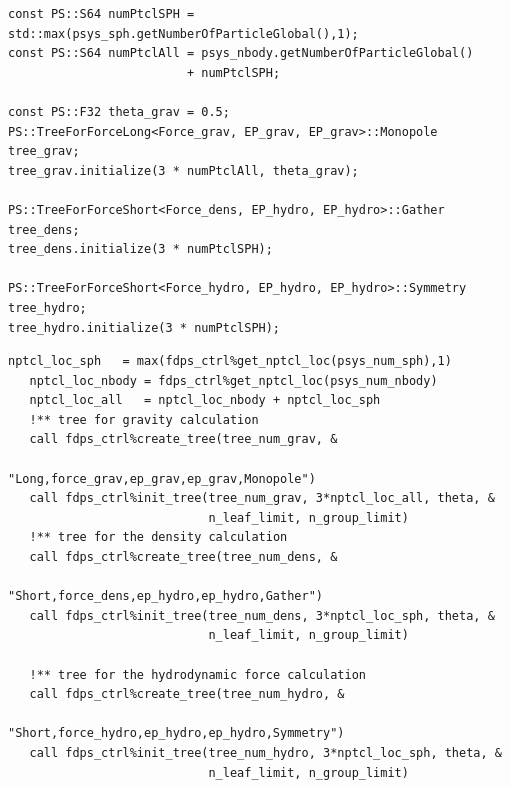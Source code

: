 \ifCpp %
\begin{lstlisting}[caption=ツリーオブジェクトの生成・初期化]
const PS::S64 numPtclSPH = std::max(psys_sph.getNumberOfParticleGlobal(),1);
const PS::S64 numPtclAll = psys_nbody.getNumberOfParticleGlobal()
                         + numPtclSPH;

const PS::F32 theta_grav = 0.5;
PS::TreeForForceLong<Force_grav, EP_grav, EP_grav>::Monopole tree_grav;
tree_grav.initialize(3 * numPtclAll, theta_grav);

PS::TreeForForceShort<Force_dens, EP_hydro, EP_hydro>::Gather tree_dens;
tree_dens.initialize(3 * numPtclSPH);

PS::TreeForForceShort<Force_hydro, EP_hydro, EP_hydro>::Symmetry tree_hydro;
tree_hydro.initialize(3 * numPtclSPH);
\end{lstlisting}
\endifCpp
\ifFtn %
\begin{lstlisting}[caption=ツリーオブジェクトの生成・初期化]
   nptcl_loc_sph   = max(fdps_ctrl%get_nptcl_loc(psys_num_sph),1)
   nptcl_loc_nbody = fdps_ctrl%get_nptcl_loc(psys_num_nbody)
   nptcl_loc_all   = nptcl_loc_nbody + nptcl_loc_sph
   !** tree for gravity calculation
   call fdps_ctrl%create_tree(tree_num_grav, &
                              "Long,force_grav,ep_grav,ep_grav,Monopole")
   call fdps_ctrl%init_tree(tree_num_grav, 3*nptcl_loc_all, theta, &
                            n_leaf_limit, n_group_limit)
   !** tree for the density calculation
   call fdps_ctrl%create_tree(tree_num_dens, &
                              "Short,force_dens,ep_hydro,ep_hydro,Gather")
   call fdps_ctrl%init_tree(tree_num_dens, 3*nptcl_loc_sph, theta, &
                            n_leaf_limit, n_group_limit)

   !** tree for the hydrodynamic force calculation
   call fdps_ctrl%create_tree(tree_num_hydro, &
                              "Short,force_hydro,ep_hydro,ep_hydro,Symmetry")
   call fdps_ctrl%init_tree(tree_num_hydro, 3*nptcl_loc_sph, theta, &
                            n_leaf_limit, n_group_limit)
\end{lstlisting}
\endifFtn
\ifC %
